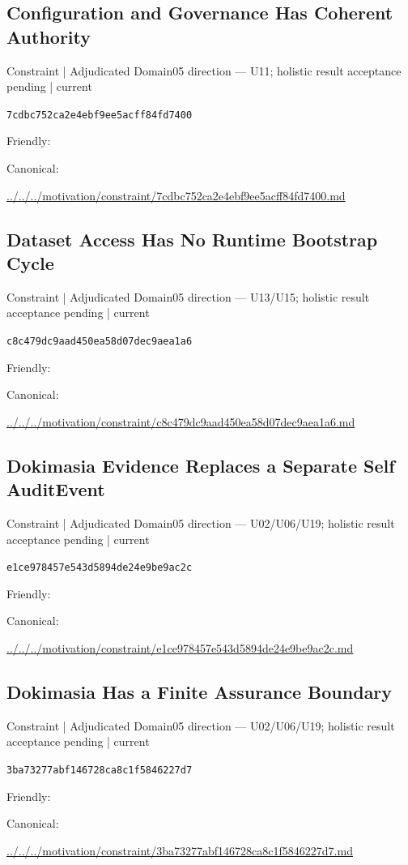 \documentclass[10pt,a4paper]{article}
\begin{document}
\subsection*{Configuration and Governance Has Coherent Authority}
{\small Constraint | Adjudicated Domain05 direction — U11; holistic result acceptance pending | current}\par
\texttt{7cdbc752ca2e4ebf9ee5acff84fd7400}\par
Friendly: \par
Canonical: \par
{\footnotesize\url{../../../motivation/constraint/7cdbc752ca2e4ebf9ee5acff84fd7400.md}}\par
\subsection*{Dataset Access Has No Runtime Bootstrap Cycle}
{\small Constraint | Adjudicated Domain05 direction — U13/U15; holistic result acceptance pending | current}\par
\texttt{c8c479dc9aad450ea58d07dec9aea1a6}\par
Friendly: \par
Canonical: \par
{\footnotesize\url{../../../motivation/constraint/c8c479dc9aad450ea58d07dec9aea1a6.md}}\par
\subsection*{Dokimasia Evidence Replaces a Separate Self AuditEvent}
{\small Constraint | Adjudicated Domain05 direction — U02/U06/U19; holistic result acceptance pending | current}\par
\texttt{e1ce978457e543d5894de24e9be9ac2c}\par
Friendly: \par
Canonical: \par
{\footnotesize\url{../../../motivation/constraint/e1ce978457e543d5894de24e9be9ac2c.md}}\par
\subsection*{Dokimasia Has a Finite Assurance Boundary}
{\small Constraint | Adjudicated Domain05 direction — U02/U06/U19; holistic result acceptance pending | current}\par
\texttt{3ba73277abf146728ca8c1f5846227d7}\par
Friendly: \par
Canonical: \par
{\footnotesize\url{../../../motivation/constraint/3ba73277abf146728ca8c1f5846227d7.md}}\par
\end{document}
